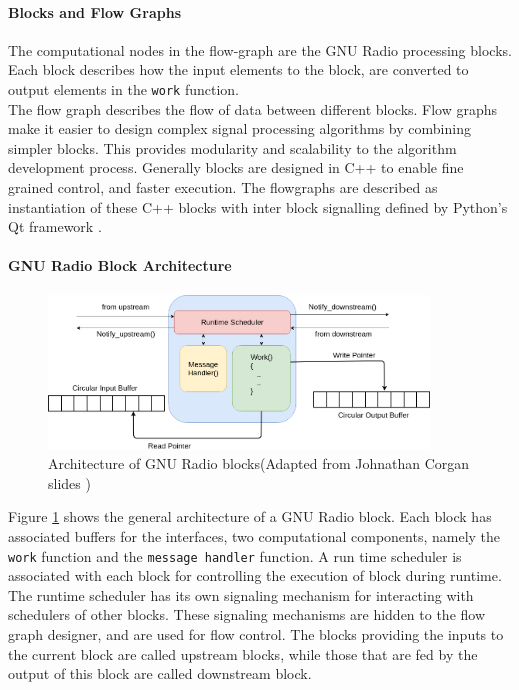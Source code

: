 \paragraph{Blocks and Flow Graphs}

The computational nodes in the flow-graph are the GNU Radio processing blocks.
Each block describes how the input elements to the block, are converted to output elements in the \texttt{work} function.\\

The flow graph describes the flow of data between different blocks.
Flow graphs make it easier to design complex signal processing algorithms by combining simpler blocks.
This provides modularity and scalability to the algorithm development process.
Generally blocks are designed in C++ to enable fine grained control, and faster execution.
The flowgraphs are described as instantiation of these C++ blocks with inter block signalling defined by Python's Qt framework \cite{noauthor_signals_nodate}.\\

\paragraph{GNU Radio Block Architecture}
\begin{figure}[h!]
\centering
\includegraphics[width=0.9\textwidth]{Figure/Block.png}
\caption{Architecture of GNU Radio blocks(Adapted from Johnathan Corgan slides \cite{corgan_gnu_2015})}
\label{block_arch}
\end{figure}

Figure \ref{block_arch} shows the general architecture of a GNU Radio block. 
Each block has associated buffers for the interfaces, two computational components, namely the \texttt{work} function and the \texttt{message handler} function.
A run time scheduler is associated with each block for controlling the execution of block during runtime. The runtime scheduler has its own signaling mechanism for interacting with schedulers of other blocks.
These signaling mechanisms are hidden to the flow graph designer, and are used for flow control.
The blocks providing the inputs to the current block are called upstream blocks, while those that are fed by the output of this block are called downstream block.\\

